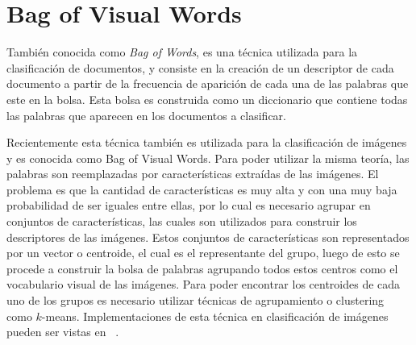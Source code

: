 
\section{Bag of Visual Words}
\label{sec:bag_of_words}
También conocida como \textit{Bag of Words}, es una técnica utilizada para la clasificación de documentos, y consiste en la creación de un descriptor de cada documento a partir de la frecuencia de aparición de cada una de las palabras que este en la bolsa. Esta bolsa es construida como un diccionario que contiene todas las palabras que aparecen en los documentos a clasificar.

Recientemente esta técnica también es utilizada para la clasificación de imágenes y es conocida como Bag of Visual Words. Para poder utilizar la misma teoría, las palabras son reemplazadas por características extraídas de las imágenes. El problema es que la cantidad de características es muy alta y con una muy baja probabilidad de ser iguales entre ellas, por lo cual es necesario agrupar en conjuntos de características, las cuales son utilizados para construir los descriptores de las imágenes. Estos conjuntos de características son representados por un vector o centroide, el cual es el representante del grupo, luego de esto se procede a construir la bolsa de palabras agrupando todos estos centros como el vocabulario visual de las imágenes. Para poder encontrar los centroides de cada uno de los grupos es necesario utilizar técnicas de agrupamiento o clustering como $k$-means. Implementaciones de esta técnica en clasificación de imágenes pueden ser vistas en ~\cite{Csurka2004,Dollar2005,Sivic2009}.

